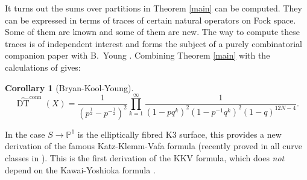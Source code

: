 \documentclass{amsart}
\newtheorem{corollary}[theorem]{Corollary}
\theoremstyle{definition}
\newcommand{\PP} {\mathbb{P}}
\newcommand{\DT}{\operatorname{DT}}
\newcommand{\conn}{\operatorname{conn}}
\begin{document}
It turns out the sums over partitions in Theorem \ref{main} can be computed. They can be expressed in terms of traces of certain natural operators on Fock space. Some of them are known and some of them are new. The way to compute these traces is of independent interest and forms the subject of a purely combinatorial companion paper with B.~Young \cite{BKY}. Combining Theorem \ref{main} with the calculations of \cite{BKY} gives:
\begin{corollary}[Bryan-Kool-Young]
$$
\widehat{\DT}^{\conn}(X) = \frac{1}{(p^{\frac{1}{2}} - p^{-\frac{1}{2}})^{2}} \prod_{k=1}^{\infty} \frac{1}{(1-p q^k)^2 (1-p^{-1} q^k)^2 (1-q)^{12N-4}}.
$$
\end{corollary}
In the case $S \rightarrow \PP^1$ is the elliptically fibred K3 surface, this provides a new derivation of the famous Katz-Klemm-Vafa formula (recently proved in all curve classes in \cite{PT}). This is the first derivation of the KKV formula, which does \emph{not} depend on the Kawai-Yoshioka formula \cite{KY}.
\end{document}
